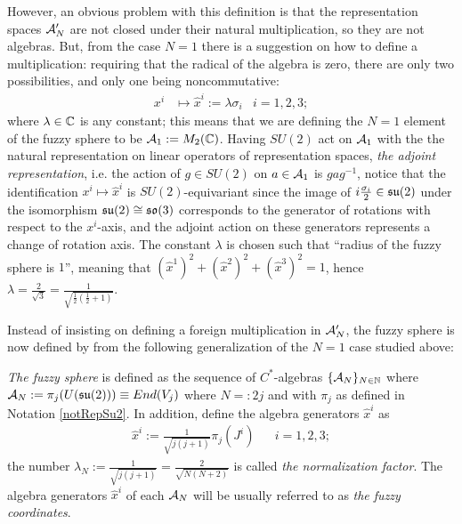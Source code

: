 However, an obvious problem with this definition is that the representation spaces $\mathcal A_N'$ are not closed under their natural multiplication, so they are not algebras. But, from the case $N = 1$ there is a suggestion on how to define a multiplication\cite{Madore}: requiring that the radical of the algebra is zero, there are only two possibilities, and only one being noncommutative:
\begin{align}
    x^i &\mapsto \hat x^i := \lambda \sigma_i & i = 1, 2, 3;
\end{align}
where $\lambda\in \mathbb{C}$ is any constant; this means that we are defining the $N = 1$ element of the fuzzy sphere to be $\textcolor{black}{\mathcal A_1} := M_2(\mathbb{C})$. Having $SU(2)$ act on $\mathcal A_1$ with the the natural representation on linear operators of representation spaces, \emph{the adjoint representation}, i.e. the action of $g \in SU(2)$ on $a \in \mathcal A_1$ is $gag^{-1}$, notice that the identification $x^i \mapsto \hat x^i$ is $SU(2)$-equivariant since the image of $i\frac{\sigma_i}{2} \in \mathfrak{su}(2)$ under the isomorphism $\mathfrak{su}(2) \cong \mathfrak{so}(3)$ corresponds to the generator of rotations with respect to the $x^i$-axis, and the adjoint action on these generators represents a change of rotation axis. The constant $\lambda$ is chosen such that ``radius of the fuzzy sphere is $1$'', meaning that $(\hat x^1)^2 + (\hat x^2)^2 + (\hat  x^3)^2 = 1$, hence $\lambda = \frac{2}{\sqrt{3}} = \frac{1}{\sqrt{\frac{1}{2} (\frac{1}{2} + 1)}}$.

Instead of insisting on defining a foreign multiplication in $\mathcal A'_N$, the fuzzy sphere is now defined by from the following generalization of the $N = 1$ case studied above:
\begin{definition}\label{definitionFuzzySphere}
\emph{The fuzzy sphere} is defined as the sequence of $C^*$-algebras $\{\mathcal A_N\}_{N \in \mathbb{N}}$ where $\mathcal A_N := \pi_j(U(\mathfrak{su}(2))) \equiv End(V_j)$ where $N =: 2j$ and with $\pi_j$ as defined in Notation \ref{notRepSu2}. In addition, define the algebra generators $\hat x^i$ as
\begin{align}\label{equationDefinitionGeneratorsFuzzySphere}
    \hat x^i := \frac{1}{\sqrt{j(j+1)}} \pi_{j}(J^i) && i = 1, 2, 3;
\end{align}
the number $\lambda_N := \frac{1}{\sqrt{j(j+1)}} = \frac{2}{\sqrt{N(N+2)}}$ is called \emph{the normalization factor}. The algebra generators $\hat x^i$ of each $\mathcal A_N$ will be usually referred to as \emph{the fuzzy coordinates}.
\end{definition}

